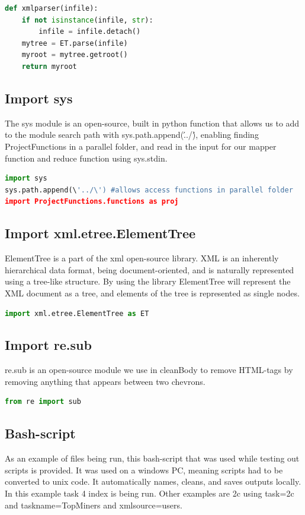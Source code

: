 \documentclass[fleqn,10pt]{wlscirep}
\begin{document}
\begin{lstlisting}[language=Python, caption=xmlparser function]
def xmlparser(infile):
    if not isinstance(infile, str):
        infile = infile.detach()
    mytree = ET.parse(infile)
    myroot = mytree.getroot()
    return myroot
\end{lstlisting}

\subsection{Import sys}
The sys module is an open-source, built in python function that allows us to add to the module search path with sys.path.append(\'../\'), enabling finding ProjectFunctions in a parallel folder, and read in the input for our mapper function and reduce function using sys.stdin.
\begin{lstlisting}[language=Python, caption=Import for sys]
import sys
sys.path.append(\'../\') #allows access functions in parallel folder
import ProjectFunctions.functions as proj
\end{lstlisting}



\subsection{Import xml.etree.ElementTree}
ElementTree is a part of the xml open-source library. XML is an inherently hierarchical data format, being document-oriented, and is naturally represented using a tree-like structure. By using the library ElementTree will represent the XML document as a tree, and elements of the tree is represented as single nodes. 
\begin{lstlisting}[language=Python, caption=Import for ElementTree]
import xml.etree.ElementTree as ET
\end{lstlisting}

\subsection{Import re.sub}
re.sub is an open-source module we use in cleanBody to remove HTML-tags by removing anything that appears between two chevrons.
\begin{lstlisting}[language=Python, caption=Import for re.sub]
from re import sub
\end{lstlisting}

\subsection{Bash-script}
As an example of files being run, this bash-script that was used while testing out scripts is provided. It was used on a windows PC, meaning scripts had to be converted to unix code. It automatically names, cleans, and saves outputs locally. In this example task 4 index is being run. Other examples are 2c using task=2c and taskname=TopMiners and xmlsource=users.

\end{document}
